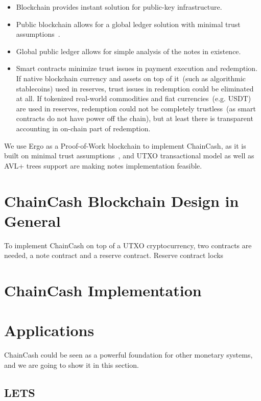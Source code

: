 \documentclass{article}   %
\newcommand{\cc}{ChainCash}
\begin{document}
\begin{itemize}
  \item{} Blockchain provides instant solution for public-key infrastructure.
  \item{} Public blockchain allows for a global ledger solution with minimal trust assumptions~\cite{kya}.
  \item{} Global public ledger allows for simple analysis of the notes in existence.
  \item{} Smart contracts minimize trust issues in payment execution and redemption. If native blockchain currency and assets on top of it~(such as algorithmic stablecoins) used in reserves, trust issues in redemption could be eliminated at all. If tokenized real-world commodities and fiat currencies~(e.g. USDT) are used in reserves, redemption could not be completely trustless~(as smart contracts do not have power off the chain), but at least there is transparent accounting in on-chain part of redemption. 
\end{itemize}

We use Ergo as a Proof-of-Work blockchain to implement \cc{}, as it is built on minimal trust assumptions~\cite{kya}, and UTXO transactional model as well as AVL+ trees support are making notes implementation feasible.


\section{\cc{} Blockchain Design in General}

To implement \cc{} on top of a UTXO cryptocurrency, two contracts are needed, a note contract and a reserve contract. Reserve contract locks 


\section{\cc{} Implementation}

\section{Applications}

\cc{} could be seen as a powerful foundation for other monetary systems, and we are going to show it in this section. 

\subsection{LETS}
\end{document}
